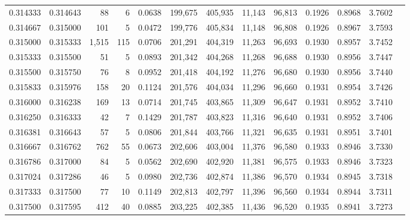 \begin{tabular}{rrrrrrrrrrrrr}
0.314333 & 0.314643 &    88 &   6 &                                     0.0638 & 199,675 & 405,935 &  11,143 &  96,813 & 0.1926 & 0.8968 & 3.7602 \\
0.314667 & 0.315000 &   101 &   5 &                                     0.0472 & 199,776 & 405,834 &  11,148 &  96,808 & 0.1926 & 0.8967 & 3.7593 \\
0.315000 & 0.315333 & 1,515 & 115 &                                     0.0706 & 201,291 & 404,319 &  11,263 &  96,693 & 0.1930 & 0.8957 & 3.7452 \\
0.315333 & 0.315500 &    51 &   5 &                                     0.0893 & 201,342 & 404,268 &  11,268 &  96,688 & 0.1930 & 0.8956 & 3.7447 \\
0.315500 & 0.315750 &    76 &   8 &                                     0.0952 & 201,418 & 404,192 &  11,276 &  96,680 & 0.1930 & 0.8956 & 3.7440 \\
0.315833 & 0.315976 &   158 &  20 &                                     0.1124 & 201,576 & 404,034 &  11,296 &  96,660 & 0.1931 & 0.8954 & 3.7426 \\
0.316000 & 0.316238 &   169 &  13 &                                     0.0714 & 201,745 & 403,865 &  11,309 &  96,647 & 0.1931 & 0.8952 & 3.7410 \\
0.316250 & 0.316333 &    42 &   7 &                                     0.1429 & 201,787 & 403,823 &  11,316 &  96,640 & 0.1931 & 0.8952 & 3.7406 \\
0.316381 & 0.316643 &    57 &   5 &                                     0.0806 & 201,844 & 403,766 &  11,321 &  96,635 & 0.1931 & 0.8951 & 3.7401 \\
0.316667 & 0.316762 &   762 &  55 &                                     0.0673 & 202,606 & 403,004 &  11,376 &  96,580 & 0.1933 & 0.8946 & 3.7330 \\
0.316786 & 0.317000 &    84 &   5 &                                     0.0562 & 202,690 & 402,920 &  11,381 &  96,575 & 0.1933 & 0.8946 & 3.7323 \\
0.317024 & 0.317286 &    46 &   5 &                                     0.0980 & 202,736 & 402,874 &  11,386 &  96,570 & 0.1934 & 0.8945 & 3.7318 \\
0.317333 & 0.317500 &    77 &  10 &                                     0.1149 & 202,813 & 402,797 &  11,396 &  96,560 & 0.1934 & 0.8944 & 3.7311 \\
0.317500 & 0.317595 &   412 &  40 &                                     0.0885 & 203,225 & 402,385 &  11,436 &  96,520 & 0.1935 & 0.8941 & 3.7273 \\

\end{tabular}
